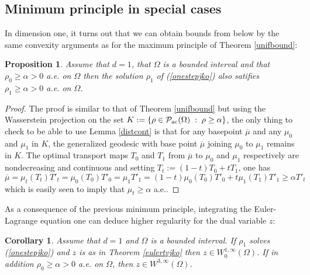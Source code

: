 \documentclass[12pt, a4paper]{article}
\numberwithin{equation}{section}
\theoremstyle{plain}
\newtheorem{coro}[thm]{Corollary}
\newtheorem{prop}[thm]{Proposition}
\theoremstyle{definition}
\theoremstyle{remark}
\newcommand\PPa{{\cal P}_{\rm{ac}}(\Omega)}
\newcommand{\ovmu}{\overline{\mu}}
\newcommand\pref[1]{(\ref{#1})}
\begin{document}
 
 \subsection{Minimum principle in special cases}\label{sec-minprinc} 
 
 
 
 
 In dimension one, it turns out that we can obtain bounds from below by the same convexity arguments as for the maximum principle of Theorem \ref{unifbound}:
 
 
 \begin{prop}\label{boundbelow1d}
 Assume that $d=1$, that  $\Omega$ is a bounded interval and that $\rho_0 \ge \alpha >0$ a.e. on $\Omega$ then the solution $\rho_1$ of \pref{onestepjko} also satifies $\rho_1 \ge \alpha >0$ a.e. on $\Omega$. 
 
 \end{prop}
 
 \begin{proof}
 The proof is similar to that of Theorem \ref{unifbound} but using the Wasserstein projection on the set $K:=\{ \rho \in \PPa \; : \; \rho \ge \alpha\}$, the only thing to check to be able to use Lemma \ref{distcont} is that for any basepoint $\ovmu$ and any $\mu_0$ and $\mu_1$ in $K$, the generalized geodesic with base point $\ovmu$ joining $\mu_0$ to $\mu_1$ remains in $K$. The optimal transport maps $T_0$ and $T_1$ from $\ovmu$ to $\mu_0$ and $\mu_1$ respectively are nondecreasing and continuous and setting $T_t:=(1-t)T_0+t T_1$, one has 
 \[\ovmu=\mu_t(T_t)T'_t= \mu_0(T_0)T'_0=\mu_1 T'_1=(1-t) \mu_0(T_0)T'_0+ t  \mu_1(T_1)T'_1\ge \alpha T'_t\]
 which is easily seen to imply that $\mu_t \ge \alpha$ a.e..
 \end{proof}
  
 
 As a consequence of the previous minimum principle, integrating the Euler-Lagrange equation one can deduce higher regularity for the dual variable $z$:

\begin{coro}\label{euler1d}
Assume that $d=1$ and $\Omega$ is a bounded interval. If $\rho_1$ solves \pref{onestepjko} and $z$ is as in Theorem \ref{eulertvjko} then $z\in W^{1, \infty}_0(\Omega)$. If in addition $\rho_0\ge \alpha>0$ a.e. on $\Omega$, then $z\in W^{3, \infty}(\Omega)$. 
\end{coro}
\end{document}
